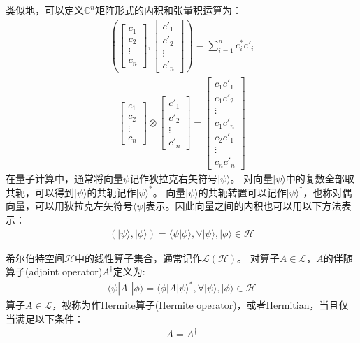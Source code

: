 类似地，可以定义\(\mathbb{C}^n\)矩阵形式的内积和张量积运算为：
\begin{align}
    \left(\left[\begin{matrix}
        c_1\\c_2\\\vdots\\c_n
    \end{matrix}\right]
    ,\left[\begin{matrix}
        c'_1\\c'_2\\\vdots\\c'_n
    \end{matrix}\right]\right)=
    \sum_{i=1}^{n}c_i^* c'_i
\end{align}
\begin{align}
    \left[\begin{matrix}
        c_1\\c_2\\\vdots\\c_n
    \end{matrix}\right]
    \otimes\left[\begin{matrix}
        c'_1\\c'_2\\\vdots\\c'_n
    \end{matrix}\right]=\left[\begin{matrix}
        c_1c'_1\\c_1c'_2\\\vdots\\c_1c'_n\\c_2c'_1\\\vdots\\c_n c'_n
    \end{matrix}\right]
\end{align}
在量子计算中，通常将向量\(\psi\)记作狄拉克右矢符号\(|\psi\rangle\)。
对向量\(|\psi\rangle\)中的复数全部取共轭，可以得到\(|\psi\rangle\)的共轭记作\(|\psi\rangle^*\)。
向量\(|\psi\rangle\)的共轭转置可以记作\(|\psi\rangle^\dagger\)，也称对偶向量，可以用狄拉克左矢符号\(\langle\psi|\)表示。因此向量之间的内积也可以用以下方法表示：
\begin{align}
    (|\psi\rangle, |\phi\rangle)=\langle \psi|\phi\rangle , \forall |\psi \rangle, |\phi \rangle\in \mathcal{H}
\end{align}

希尔伯特空间\(\mathcal{H}\)中的线性算子集合，通常记作\(\mathcal{L} (\mathcal{H})\)。
对算子\(A \in \mathcal{L}\)，$A$的伴随算子(adjoint operator)$A^\dagger$定义为:
\begin{align}
    \langle \psi |A^\dagger|\phi \rangle = \langle \phi |A|\psi \rangle^*, \forall |\psi \rangle, |\phi \rangle\in \mathcal{H}
\end{align}
算子\(A \in \mathcal{L}\)，被称为作Hermite算子(Hermite operator)，或者Hermitian，当且仅当满足以下条件：
\begin{align}
    A = A^\dagger
\end{align}


